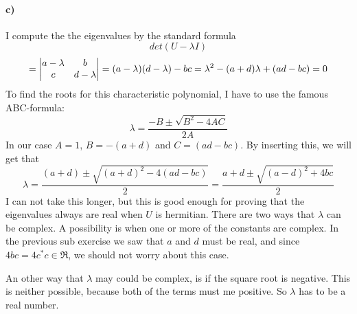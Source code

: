 \documentclass{scrartcl}
\begin{document}
\paragraph{c)}
I compute the the eigenvalues by the standard formula
\begin{equation}
det(U-\lambda I)
\end{equation}
$$=\mqty|a-\lambda&b\\c&d-\lambda|=(a-\lambda)(d-\lambda)-bc
=\lambda^2-(a+d)\lambda+(ad-bc)=0$$
To find the roots for this characteristic polynomial, I have to use the famous ABC-formula:
\begin{equation}
\lambda=\frac{-B\pm\sqrt{B^2-4AC}}{2A}
\end{equation}
In our case $A=1$, $B=-(a+d)$ and $C=(ad-bc)$. By inserting this, we will get that
\begin{equation}
\lambda=\frac{(a+d)\pm\sqrt{(a+d)^2-4(ad-bc)}}{2}=\frac{a+d\pm\sqrt{(a-d)^2+4bc}}{2}
\end{equation}
I can not take this longer, but this is good enough for proving that the eigenvalues always are real when $U$ is hermitian. There are two ways that $\lambda$ can be complex. 
A possibility is when one or more of the constants are complex. In the previous sub exercise we saw that $a$ and $d$ must be real, and since $4bc=4c^*c \in \Re $, we should not worry about this case.
\par \vspace{3mm}
An other way that $\lambda$ may could be complex, is if the square root is negative. This is neither possible, because both of the terms must me positive. So $\lambda$ has to be a real number.
\end{document}
